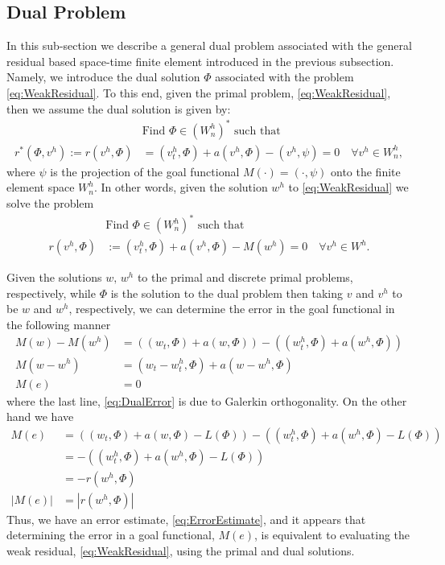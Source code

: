 \subsection{Dual Problem} \label{sse:Dual}
In this sub-section we describe a general dual problem associated with the
general residual based space-time finite element introduced in the previous
subsection. Namely, we introduce the dual solution $\Phi$ associated with the
problem \eqref{eq:WeakResidual}. To this end, given the primal problem,
\eqref{eq:WeakResidual}, then we assume the dual solution is given by:
\begin{equation*}
    \begin{split}
        &\text{Find } \Phi \in (W^h_n)^* \text{ such that} \\
        r^*(\Phi, v^h) := r(v^h, \Phi) &= (v^h_t, \Phi) + a(v^h, \Phi)
            - (v^h, \psi) = 0 \quad \forall v^h \in W^h_n,
    \end{split}
\end{equation*}
where $\psi$ is the projection of the goal functional $M(\cdot) = (\cdot, \psi)$
onto the finite element space $W^h_n$. In other words, given the solution $w^h$
to \eqref{eq:WeakResidual} we solve the problem
\begin{equation}
    \begin{split}
        &\text{Find } \Phi \in (W^h_n)^* \text{ such that} \\
        r(v^h, \Phi) &:= (v^h_t, \Phi) + a(v^h, \Phi) - M(w^h) = 0
                       \quad \forall v^h \in W^h.
    \end{split}
    \label{eq:Dual}
\end{equation}

Given the solutions $w,\, w^h$ to the primal and discrete primal problems,
respectively, while $\Phi$ is the solution to the dual problem then
taking $v$ and $v^h$ to be $w$ and $w^h$, respectively, we can determine the
error in the goal functional in the following manner
\begin{align}
    M(w) - M(w^h) &= \left((w_t, \Phi) + a(w, \Phi)\right)
                      - \left( (w^h_t, \Phi) + a(w^h, \Phi) \right) \nonumber \\
    M(w - w^h) &= (w_t - w^h_t, \Phi) + a(w - w^h, \Phi) \nonumber \\
    M(e) &= 0 \label{eq:DualError}
\end{align}
where the last line, \eqref{eq:DualError} is due to Galerkin orthogonality. On
the other hand we have
\begin{align}
    M(e) & = \left((w_t, \Phi) + a(w, \Phi) - L(\Phi)\right)
             - \left((w^h_t, \Phi) + a(w^h, \Phi) - L(\Phi) \right) \nonumber \\
    &= -\left((w^h_t, \Phi) + a(w^h, \Phi) - L(\Phi) \right) \nonumber \\
    &= -r(w^h, \Phi) \label{eq:ErrorRepresentation} \\
    |M(e)| &= |r(w^h, \Phi)| \label{eq:ErrorEstimate}
\end{align}
Thus, we have an error estimate, \eqref{eq:ErrorEstimate}, and it appears that
determining the error in a goal functional, $M(e)$, is equivalent to
evaluating the weak residual, \eqref{eq:WeakResidual}, using the primal and dual
solutions.

